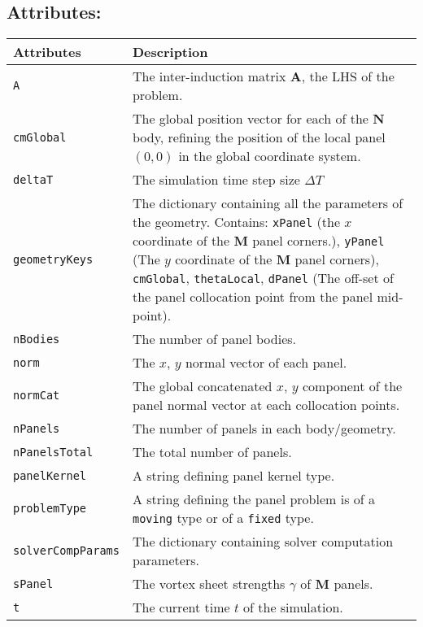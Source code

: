 \subsection*{Attributes:}
\begingroup
\footnotesize
\begin{longtable}{|l|p{11cm}|}
	\hline
	\textbf{Attributes} & \textbf{Description}\\
	\toprule
    \texttt{A} 		& The inter-induction matrix $\mathbf{A}$, the LHS of the problem. \\ \hline
    \texttt{cmGlobal} & The global position vector for each of the $\mathbf{N}$
                       body, refining the position of the local panel $(0,0)$ in the
                       global coordinate system. \\\hline
    \texttt{deltaT} & The simulation time step size $\Delta T$\\ \hline
    \texttt{geometryKeys} & The dictionary containing all the parameters of the geometry. Contains: \texttt{xPanel} (the $x$ coordinate of the $\mathbf{M}$ panel corners.), \texttt{yPanel} (The $y$ coordinate of the $\mathbf{M}$ panel corners), \texttt{cmGlobal}, \texttt{thetaLocal}, \texttt{dPanel} (The off-set of the panel collocation point from the panel mid-point).  \\ \hline
    \texttt{nBodies} & The number of panel bodies.\\\hline
    \texttt{norm} & The $x$, $y$ normal vector of each panel.\\\hline
    \texttt{normCat} & The global concatenated $x$, $y$ component of the panel normal vector at each collocation points.\\          \hline
    \texttt{nPanels} & The number of panels in each body/geometry. \\ \hline
    \texttt{nPanelsTotal} & The total number of panels.\\    \hline      
    \texttt{panelKernel} & A string defining panel kernel type. \\\hline          
    \texttt{problemType} & A string defining the panel problem is of a \texttt{moving} type or of a \texttt{fixed} type.\\ \hline
    \texttt{solverCompParams} & The dictionary containing solver computation parameters.\\          \hline
	\texttt{sPanel} & The vortex sheet strengths $\gamma$ of $\mathbf{M}$ panels. \\          \hline
	\texttt{t} & The current time $t$ of the simulation.\\          \hline

\end{longtable}
